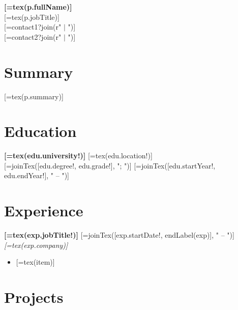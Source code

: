 \documentclass[letterpaper,11pt]{article}
\begin{document}
\begin{center}
{\LARGE\bfseries {[=tex(p.fullName)]}}\\[4pt]
{\large {[=tex(p.jobTitle)]}}\\[4pt]
{[=contact1?join(r" \quad $|$ \quad ")]}\\
{[=contact2?join(r" \quad $|$ \quad ")]}
\end{center}

\section*{Summary}

{[=tex(p.summary)]}

\section*{Education}

{\bfseries {[=tex(edu.university!)]}} \hfill {[=tex(edu.location!)]}
\\
{[=joinTex([edu.degree!, edu.grade!], "; ")]} \hfill {[=joinTex([edu.startYear!, edu.endYear!], " -- ")]}

\section*{Experience}

{\bfseries {[=tex(exp.jobTitle!)]}} \hfill {[=joinTex([exp.startDate!, endLabel(exp)], " -- ")]}
\\
{\itshape {[=tex(exp.company)]}}

\begin{itemize}
\setlength{\itemsep}{0pt}\setlength{\parsep}{0pt}\setlength{\parskip}{0pt}
\item {[=tex(item)]}
\end{itemize}

\section*{Projects}
\end{document}
